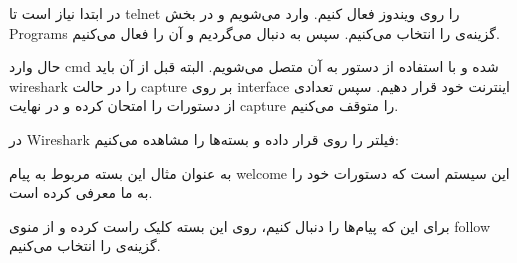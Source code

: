 
در ابتدا نیاز است تا telnet را روی ویندوز فعال کنیم. وارد
 می‌شویم و در بخش Programs گزینه‌ی
را انتخاب می‌کنیم.
سپس به دنبال 
می‌گردیم و آن را فعال می‌کنیم.



حال وارد cmd شده و با استفاده از دستور 
به آن متصل می‌شویم. البته قبل از آن باید wireshark‌ را در حالت capture بر روی interface اینترنت خود قرار دهیم. سپس تعدادی از دستورات را امتحان کرده و در نهایت capture را متوقف می‌کنیم.

در Wireshark فیلتر را روی
قرار داده و بسته‌ها را مشاهده می‌کنیم:


{
}

به عنوان مثال این بسته مربوط به پیام welcome این سیستم است که دستورات خود را به ما معرفی کرده است.

برای این که پیام‌ها را دنبال کنیم، روی این بسته کلیک راست کرده و از منوی follow‌ گزینه‌ی 
را انتخاب می‌کنیم.

{
}

